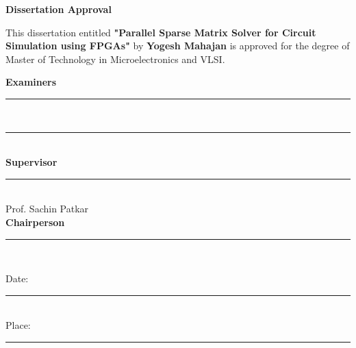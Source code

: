 \begin{Approval}
\noindent

\begin{center}
    {\Large \textbf{Dissertation Approval}}
\end{center}

This dissertation entitled \textbf{"Parallel Sparse Matrix Solver for Circuit Simulation using FPGAs"} by \textbf{Yogesh Mahajan}
is approved for the degree of Master of Technology in Microelectronics and VLSI.

\begin{flushright}
\vspace{2cm}
\textbf{Examiners} \\
\vspace{1.2cm}
\rule{8cm}{0.4pt}\\
\vspace{1.2cm}
\rule{8cm}{0.4pt}\\

\vspace{2cm}
\textbf{Supervisor} \\
\vspace{1.2cm} 
\rule{8cm}{0.4pt}\\
Prof. Sachin Patkar\\

\vspace{2cm}
\textbf{Chairperson} \\
\vspace{1.2cm}
\rule{8cm}{.4pt}\\
\vspace{2cm}
\end{flushright}

\begin{flushleft}
Date: \rule{4cm}{.4pt}\\
\vspace{1cm}
Place: \rule{4cm}{.4pt}\\
\end{flushleft}

\end{Approval}